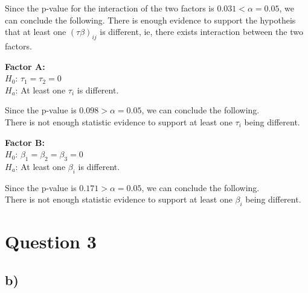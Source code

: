 \documentclass{article}
\begin{document}
Since the p-value for the interaction of the two factors is $0.031 < \alpha = 0.05$, we can conclude the following.
There is enough evidence to support the hypotheis that at least one $(\tau \beta)_{ij}$ is different,
ie, there exists interaction between the two factors.


\begin{flushleft}
    \textbf{Factor A:}\\
    $H_0$: $\tau_1 = \tau_2 = 0$ \\
    $H_a$: At least one $\tau_i$ is different.\\
\end{flushleft}

Since the p-value is $0.098 > \alpha = 0.05$, we can conclude the following. \\
There is not enough statistic evidence to support at least one $\tau_i$ being different.


\begin{flushleft}
    \textbf{Factor B:} \\
    $H_0$: $\beta_1 = \beta_2 = \beta_3 = 0$ \\
    $H_a$: At least one $\beta_i$ is different.\\
\end{flushleft}

Since the p-value is $0.171 > \alpha = 0.05$, we can conclude the following. \\
There is not enough statistic evidence to support at least one $\beta_i$ being different.

\clearpage
\section*{Question 3}

\subsection*{b)}

\end{document}
